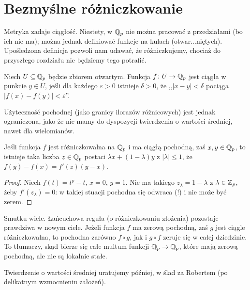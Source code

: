\section{Bezmyślne różniczkowanie}	
Metryka  zadaje ciągłość.
Niestety, w $\mathbb Q_p$ nie można pracować z przedziałami (bo ich nie ma); można jednak definiować funkcje na kulach (otwar...niętych). 
Upośledzona definicja pozwoli nam udawać, że różniczkujemy, chociaż do przyszłego rozdziału nie będziemy tego potrafić.

\begin{definicja}
	Niech $U \subseteq \mathbb Q_p$ będzie zbiorem otwartym.
	Funkcja $f \colon U \to \mathbb Q_p$ jest ciągła w punkcie $y \in U$, jeśli dla każdego $\varepsilon > 0$ istnieje $\delta > 0$, że ,,$|x-y| < \delta$ pociąga $|f(x) - f(y)| < \varepsilon$''.
\end{definicja}


Użyteczność pochodnej (jako granicy ilorazów różnicowych) jest jednak ograniczona, jako że nie mamy do dyspozycji twierdzenia o wartości średniej, nawet dla wielomianów.

\begin{fakt} [fałszywy]
	Jeśli funkcja $f$ jest różniczkowalna na $\mathbb Q_p$ i ma ciągłą pochodną, zaś $x,y \in \mathbb Q_p$, to istnieje taka liczba $z \in \mathbb Q_p$ postaci $\lambda x + (1-\lambda)y$ z $|\lambda| \le 1$, że $f(y) - f(x) = f'(z) (y-x)$.
\end{fakt}

\begin{proof}
	Niech $f(t) = t^p - t$, $x = 0$, $y = 1$.
	Nie ma takiego $z_\lambda = 1 - \lambda$ z $\lambda \in \mathbb Z_p$, żeby $f'(z_\lambda) = 0$: w takiej stuacji pochodna się odwraca (!) i nie może być zerem.
\end{proof}

Smutku wiele.
Łańcuchowa reguła (o różniczkowaniu złożenia) pozostaje prawdziwa w nowym ciele.
Jeżeli funkcja $f$ ma zerową pochodną, zaś $g$ jest ciągle różniczkowalna, to pochodna zarówno $f \circ g$, jak i $g \circ f$ zeruje się w całej dziedzinie.
To tłumaczy, skąd bierze się całe multum funkcji $\mathbb Q_p \to \mathbb Q_p$, które mają zerową pochodną, ale nie są lokalnie stałe.

Twierdzenie o wartości średniej uratujemy później, w ślad za Robertem (po delikatnym wzmocnieniu założeń).